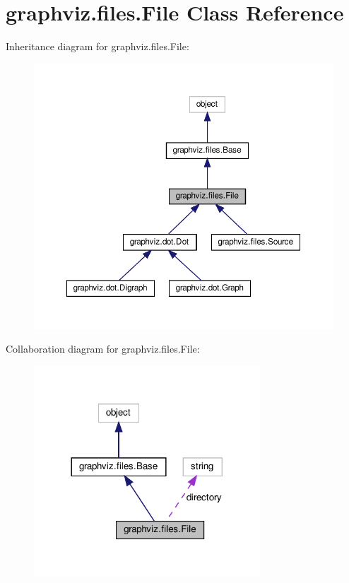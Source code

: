 \hypertarget{classgraphviz_1_1files_1_1File}{}\section{graphviz.\+files.\+File Class Reference}
\label{classgraphviz_1_1files_1_1File}


Inheritance diagram for graphviz.\+files.\+File\+:
\nopagebreak
\begin{figure}[H]
\begin{center}
\leavevmode
\includegraphics[width=350pt]{classgraphviz_1_1files_1_1File__inherit__graph}
\end{center}
\end{figure}


Collaboration diagram for graphviz.\+files.\+File\+:
\nopagebreak
\begin{figure}[H]
\begin{center}
\leavevmode
\includegraphics[width=240pt]{classgraphviz_1_1files_1_1File__coll__graph}
\end{center}
\end{figure}
